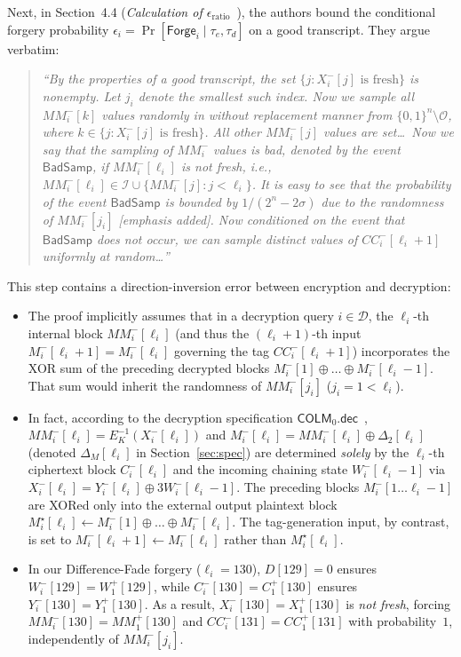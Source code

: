 \documentclass[11pt,a4paper]{article}
\theoremstyle{definition}
\theoremstyle{remark}
\newcommand{\COLMzero}{\mathsf{COLM}_0}
\begin{document}
Next, in Section~4.4 (\emph{Calculation of $\epsilon_{\mathrm{ratio}}$}~\cite[p.~24]{COLM24}), the authors bound the conditional forgery probability $\epsilon_i = \Pr[\mathsf{Forge}_i \mid \tau_e, \tau_d]$ on a good transcript. They argue verbatim:
\begin{quote}
\itshape
``By the properties of a good transcript, the set $\{j : X_i^-[j] \text{ is fresh}\}$ is nonempty. Let $j_i$ denote the smallest such index. Now we sample all $MM_i^-[k]$ values randomly in without replacement manner from $\{0,1\}^n \setminus \mathcal{O}$, where $k \in \{j : X_i^-[j] \text{ is fresh}\}$. All other $MM_i^-[j]$ values are set\dots\ Now we say that the sampling of $MM_i^-$ values is bad, denoted by the event $\mathsf{BadSamp}$, if $MM_i^-[\ell_i]$ is not fresh, i.e., $MM_i^-[\ell_i] \in \mathcal{I} \cup \{MM_i^-[j] : j < \ell_i\}$. It is easy to see that the probability of the event $\mathsf{BadSamp}$ is bounded by $1/(2^n - 2\sigma)$ \emph{due to the randomness of $MM_i^-[j_i]$} \textup{[emphasis added]}. Now conditioned on the event that $\mathsf{BadSamp}$ does not occur, we can sample distinct values of $CC_i^-[\ell_i + 1]$ uniformly at random\dots''
\end{quote}
This step contains a direction-inversion error between encryption and decryption:
\begin{itemize}[leftmargin=2em]
    \item The proof implicitly assumes that in a decryption query $i \in \mathcal{D}$, the $\ell_i$-th internal block $MM_i^-[\ell_i]$ (and thus the $(\ell_i+1)$-th input $M_i^-[\ell_i+1] = M_i^-[\ell_i]$ governing the tag $CC_i^-[\ell_i+1]$) incorporates the XOR sum of the preceding decrypted blocks $M_i^-[1] \oplus \dots \oplus M_i^-[\ell_i-1]$. That sum would inherit the randomness of $MM_i^-[j_i]$ ($j_i = 1 < \ell_i$).
    \item In fact, according to the decryption specification $\COLMzero.\mathsf{dec}$~\cite[Figure~3, p.~12]{COLM24}, $MM_i^-[\ell_i] = E_K^{-1}(X_i^-[\ell_i])$ and $M_i^-[\ell_i] = MM_i^-[\ell_i] \oplus \Delta_2[\ell_i]$ (denoted $\Delta_M[\ell_i]$ in Section~\ref{sec:spec}) are determined \emph{solely} by the $\ell_i$-th ciphertext block $C_i^-[\ell_i]$ and the incoming chaining state $W_i^-[\ell_i-1]$ via $X_i^-[\ell_i] = Y_i^-[\ell_i] \oplus 3W_i^-[\ell_i-1]$. The preceding blocks $M_i^-[1 \dots \ell_i-1]$ are XORed only into the external output plaintext block $M_i^\star[\ell_i] \leftarrow M_i^-[1] \oplus \dots \oplus M_i^-[\ell_i]$. The tag-generation input, by contrast, is set to $M_i^-[\ell_i+1] \leftarrow M_i^-[\ell_i]$ rather than $M_i^\star[\ell_i]$.
    \item In our Difference-Fade forgery ($\ell_i = 130$), $D[129] = 0$ ensures $W_i^-[129] = W_1^+[129]$, while $C_i^-[130] = C_1^+[130]$ ensures $Y_i^-[130] = Y_1^+[130]$. As a result, $X_i^-[130] = X_1^+[130]$ is \emph{not fresh}, forcing $MM_i^-[130] = MM_1^+[130]$ and $CC_i^-[131] = CC_1^+[131]$ with probability~$1$, independently of $MM_i^-[j_i]$.
\end{itemize}
\end{document}

